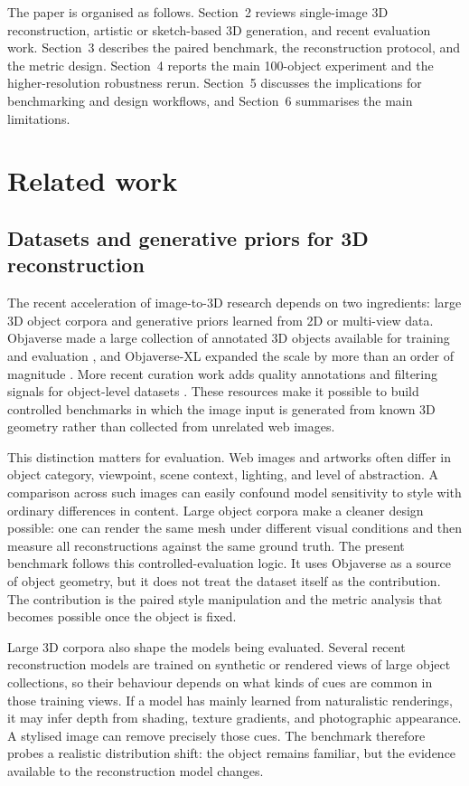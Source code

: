 \documentclass[12pt,a4paper]{article}
\begin{document}
The paper is organised as follows. Section~2 reviews single-image 3D reconstruction, artistic or sketch-based 3D generation, and recent evaluation work. Section~3 describes the paired benchmark, the reconstruction protocol, and the metric design. Section~4 reports the main 100-object experiment and the higher-resolution robustness rerun. Section~5 discusses the implications for benchmarking and design workflows, and Section~6 summarises the main limitations.

\section{Related work}

\subsection{Datasets and generative priors for 3D reconstruction}

The recent acceleration of image-to-3D research depends on two ingredients: large 3D object corpora and generative priors learned from 2D or multi-view data. Objaverse made a large collection of annotated 3D objects available for training and evaluation \parencite{deitke2022objaverse}, and Objaverse-XL expanded the scale by more than an order of magnitude \parencite{deitke2023objaversexl}. More recent curation work adds quality annotations and filtering signals for object-level datasets \parencite{lin2025objaversepp}. These resources make it possible to build controlled benchmarks in which the image input is generated from known 3D geometry rather than collected from unrelated web images.

This distinction matters for evaluation. Web images and artworks often differ in object category, viewpoint, scene context, lighting, and level of abstraction. A comparison across such images can easily confound model sensitivity to style with ordinary differences in content. Large object corpora make a cleaner design possible: one can render the same mesh under different visual conditions and then measure all reconstructions against the same ground truth. The present benchmark follows this controlled-evaluation logic. It uses Objaverse as a source of object geometry, but it does not treat the dataset itself as the contribution. The contribution is the paired style manipulation and the metric analysis that becomes possible once the object is fixed.

Large 3D corpora also shape the models being evaluated. Several recent reconstruction models are trained on synthetic or rendered views of large object collections, so their behaviour depends on what kinds of cues are common in those training views. If a model has mainly learned from naturalistic renderings, it may infer depth from shading, texture gradients, and photographic appearance. A stylised image can remove precisely those cues. The benchmark therefore probes a realistic distribution shift: the object remains familiar, but the evidence available to the reconstruction model changes.
\end{document}
